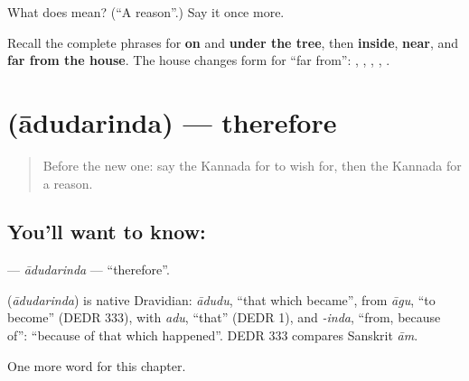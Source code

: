 \begin{tcolorbox}[breakable,colback=teal!4,colframe=teal!35!black,title={Before you move on}]
What does  mean? (\textquotedblleft{}A reason\textquotedblright{}.) Say it once more.
\end{tcolorbox}

\begin{tcolorbox}[breakable,colback=teal!4,colframe=teal!35!black,title={Before you move on}]
Recall the complete phrases for \textbf{on} and \textbf{under the tree}, then \textbf{inside}, \textbf{near}, and \textbf{far from the house}. The house changes form for “far from”: \textbf{ }, \textbf{ }, \textbf{}, \textbf{ }, \textbf{ }.
\end{tcolorbox}
\section[\texorpdfstring{\kn{ಆದುದರಿಂದ} (ādudarinda)}{ಆದುದರಿಂದ (ādudarinda)}]{ (ādudarinda) — therefore}

\label{lesson:KA-C115-adudarinda}



\begin{quote}
Before the new one: say the Kannada for to wish for, then the Kannada for a reason.
\end{quote}

\subsection*{You'll want to know: }
\textbf{} — \emph{ādudarinda} — \textquotedblleft{}therefore\textquotedblright{}.

\begin{cousinweb}
\textbf{} (\emph{ādudarinda}) is native Dravidian: \emph{ādudu}, \textquotedblleft{}that which became\textquotedblright{}, from \emph{āgu}, \textquotedblleft{}to become\textquotedblright{} (DEDR 333), with \emph{adu}, \textquotedblleft{}that\textquotedblright{} (DEDR 1), and \emph{-inda}, \textquotedblleft{}from, because of\textquotedblright{}: \textquotedblleft{}because of that which happened\textquotedblright{}. DEDR 333 compares Sanskrit \emph{ām}.
\end{cousinweb}

\begin{grammarlens}[title={What you've built}]
One more word for this chapter.
\end{grammarlens}

